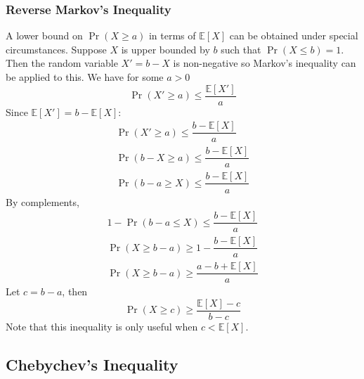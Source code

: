 \documentclass[11pt]{report} %
\begin{document}
\subsubsection{Reverse Markov's Inequality}

A lower bound on $\operatorname{Pr}\left(X \geq a\right)$ in terms of $\mathbb{E}\left[X\right]$ can be obtained under special circumstances. Suppose $X$ is upper bounded by $b$ such that $\operatorname{Pr}\left(X \leq b\right) = 1$. Then the random variable $X' = b - X$ is non-negative so Markov's inequality can be applied to this. We have for some $a > 0$
\begin{equation}
\operatorname{Pr}\left(X' \geq a\right) \leq \dfrac{\mathbb{E}\left[X'\right]}{a}
\end{equation}
Since $\mathbb{E}\left[X'\right] = b - \mathbb{E}\left[X\right]$:
\begin{gather}
\operatorname{Pr}\left(X' \geq a\right) \leq \dfrac{b - \mathbb{E}\left[X\right]}{a} \\
\operatorname{Pr}\left(b - X \geq a\right) \leq \dfrac{b - \mathbb{E}\left[X\right]}{a} \\
\operatorname{Pr}\left(b - a \geq X\right) \leq \dfrac{b - \mathbb{E}\left[X\right]}{a}
\end{gather}
By complements,
\begin{gather}
1 - \operatorname{Pr}\left(b - a \leq X\right) \leq \dfrac{b - \mathbb{E}\left[X\right]}{a} \\
\operatorname{Pr}\left(X \geq b - a\right) \geq 1 - \dfrac{b - \mathbb{E}\left[X\right]}{a} \\
\operatorname{Pr}\left(X \geq b - a\right) \geq \dfrac{a - b + \mathbb{E}\left[X\right]}{a}
\end{gather}
Let $c = b - a$, then
\begin{equation}
\operatorname{Pr}\left(X \geq c\right) \geq \dfrac{\mathbb{E}\left[X\right] - c}{b - c}
\end{equation}
Note that this inequality is only useful when $c < \mathbb{E}\left[X\right]$.

\subsection{Chebychev's Inequality}
\end{document}
